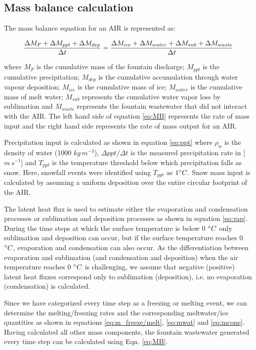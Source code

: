 \subsection{Mass balance calculation}

The mass balance equation for an AIR is represented as:

\begin{equation}
	\frac{\Delta M_{F} + \Delta M_{ppt} + \Delta M_{dep}}{\Delta t} = \frac{\Delta M_{ice} +\Delta M_{water} +
		\Delta M_{sub} + \Delta M_{waste}}{\Delta t}  \\
	\label{eq:MB}
\end{equation}

where $M_{F}$ is the cumulative mass of the fountain discharge; $M_{ppt}$ is the cumulative precipitation;  $M_{dep}$ is the cumulative
accumulation through water vapour deposition; $M_{ice}$ is the cumulative mass of ice; $M_{water}$ is the cumulative
mass of melt water; $M_{sub}$ represents the cumulative water vapor loss by sublimation and $M_{waste}$ represents the
fountain wastewater that did not interact with the AIR. The left hand side of equation \ref{eq:MB} represents the rate of
mass input and the right hand side represents the rate of mass output for an AIR.

Precipitation input is calculated as shown in equation \ref{eq:ppt} where $\rho_{w}$ is the density of water (1000
$kg\,m^{-3}$), $\Delta ppt/ \Delta t$ is the measured precipitation rate in [$m\,s^{-1}$] and $T_{ppt}$ is the temperature threshold
below which precipitation falls as snow. Here, snowfall events were identified using $T_{ppt}$ as $1 ^{\circ} C$. Snow
mass input is calculated by assuming a uniform deposition over the entire circular footprint of the AIR.

The latent heat flux is used to estimate either the evaporation and condensation processes or sublimation and deposition
processes as shown in equation \ref{eq:vap}. During the time steps at which the surface temperature is below 0 $^{\circ} C$ only
sublimation and deposition can occur, but if the surface temperature reaches 0 $^{\circ} C$, evaporation and condensation
can also occur. As the differentiation between evaporation and sublimation (and condensation and deposition) when the
air temperature reaches 0 $^{\circ} C$ is challenging, we assume that negative (positive) latent heat fluxes correspond
only to sublimation (deposition), i.e. no evaporation (condensation) is calculated.

Since we have categorized every time step as a freezing or melting event, we can determine the melting/freezing
rates and the corresponding meltwater/ice quantities as shown in equations \ref{eq:m_freeze/melt}, \ref{eq:mwat}
and \ref{eq:mcone}. Having calculated all other mass components, the fountain wastewater generated every
time step can be calculated using Eqn. \ref{eq:MB}.

